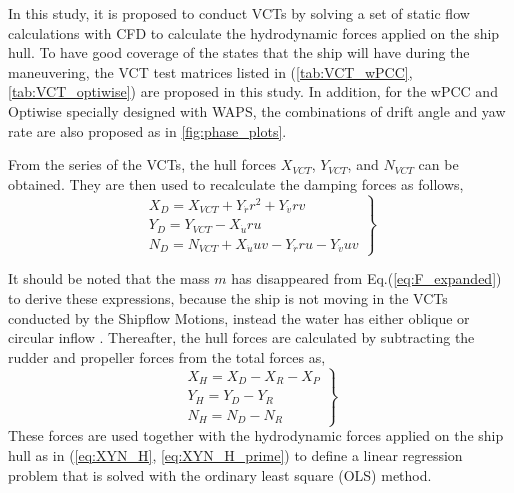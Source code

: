 \noindent In this study, it is proposed to conduct VCTs by solving a set of static flow calculations with CFD to calculate the hydrodynamic forces applied on the ship hull. To have good coverage of the states that the ship will have during the maneuvering, the VCT test matrices listed in (\autoref{tab:VCT_wPCC}, \autoref{tab:VCT_optiwise}) are proposed in this study. In addition, for the wPCC and Optiwise specially designed with WAPS, the combinations of drift angle and yaw rate are also proposed as in \autoref{fig:phase_plots}. 


From the series of the VCTs, the hull forces  $X_{VCT}$, $Y_{VCT}$, and $N_{VCT}$ can be obtained. They are then used to recalculate the damping forces as follows,
\begin{equation}
    \label{eq:X_D}
    \left.\begin{aligned}
    X_{D} = X_{VCT} + Y_{\dot{r}} r^{2} + Y_{\dot{v}} r v \\
    Y_{D} =  Y_{VCT} - X_{\dot{u}} r u\\
    N_{D} = N_{VCT} + X_{\dot{u}} u v - Y_{\dot{r}} r u - Y_{\dot{v}} u v
    \end{aligned}\right\}
\end{equation}

It should be noted that the mass $m$ has disappeared from Eq.(\ref{eq:F_expanded}) to derive these expressions, because the ship is not moving in the VCTs conducted by the Shipflow Motions, instead the water has either oblique or circular inflow \citep{roychoudhuryCFDSimulationsSteady2017}.
Thereafter, the hull forces are calculated by subtracting the rudder and propeller forces from the total forces as,
\begin{equation}
    \label{eq:X_H_VCT}
    \left.\begin{aligned}
    X_H = X_D - X_R - X_P \\
    Y_H = Y_D - Y_R \\
    N_H = N_D - N_R
    \end{aligned}\right\}
\end{equation}
These forces are used together with the hydrodynamic forces applied on the ship hull as in (\autoref{eq:XYN_H}, \autoref{eq:XYN_H_prime}) to define a linear regression problem that is solved with the ordinary least square (OLS) method.

